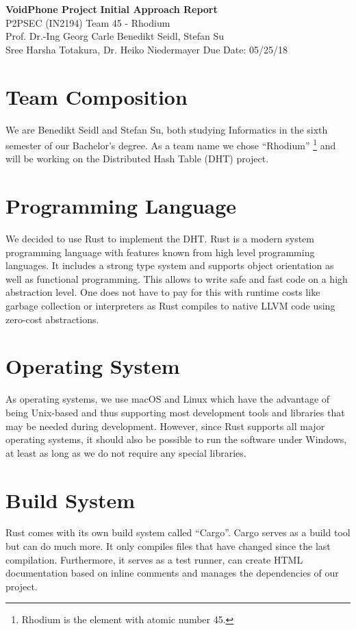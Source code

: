 \documentclass[a4paper, 11pt]{article}
\begin{document}
\noindent
\large\textbf{VoidPhone Project} \hfill \textbf{Initial Approach Report} \\
\normalsize P2PSEC (IN2194)  \hfill Team 45 - Rhodium\\
Prof. Dr.-Ing Georg Carle \hfill Benedikt Seidl, Stefan Su \\
Sree Harsha Totakura, Dr. Heiko Niedermayer \hfill Due Date: 05/25/18

\section*{Team Composition}
We are Benedikt Seidl and Stefan Su, both studying Informatics in the sixth semester of our Bachelor's degree. As a team name we chose ``Rhodium'' \footnote{Rhodium is the element with atomic number 45.} and will be working on the Distributed Hash Table (DHT) project.

\section*{Programming Language}
We decided to use Rust \cite{Rust} to implement the DHT. Rust is a modern system programming language with features known from high level programming languages. It includes a strong type system and supports object orientation as well as functional programming. This allows to write safe and fast code on a high abstraction level. One does not have to pay for this with runtime costs like garbage collection or interpreters as Rust compiles to native LLVM code using zero-cost abstractions. \cite{RustFAQ}

\section*{Operating System}
As operating systems, we use macOS and Linux which have the advantage of being Unix-based and thus supporting most development tools and libraries that may be needed during development. However, since Rust supports all major operating systems, it should also be possible to run the software under Windows, at least as long as we do not require any special libraries.

\section*{Build System}
Rust comes with its own build system called ``Cargo''. \cite{CargoBook} Cargo serves as a build tool but can do much more. It only compiles files that have changed since the last compilation. Furthermore, it serves as a test runner, can create HTML documentation based on inline comments and manages the dependencies of our project.
\end{document}
